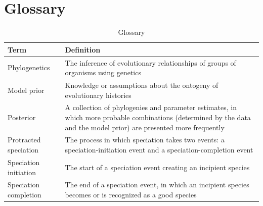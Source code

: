 \documentclass{article}
\newcommand*\richel[1]{\textcolor{orange}{\textbf{[RJCB: #1]}}}
\begin{document}
\section{Glossary}
\begin{table}
  \centering 
  \begin{tabular}{l p{}}
    \hline
    Term                  & Definition \\
    \hline
    \hline
    Phylogenetics         & The inference of evolutionary relationships of groups of organisms using genetics \\
    Model prior           & Knowledge or assumptions about the ontogeny of evolutionary histories \\
    Posterior             & A collection of phylogenies and parameter estimates, in which more probable combinations (determined by the data and the model prior) are presented more frequently \\
    Protracted speciation & The process in which speciation takes two events: a speciation-initiation event and a speciation-completion event  \\
    Speciation initiation & The start of a speciation event creating an incipient species \\
    Speciation completion & The end of a speciation event, in which an incipient species becomes or is recognized as a good species \\
    \hline
  \end{tabular}
  \caption{
    Glossary
  }
  \label{table:glossary}
\end{table}



\end{document}
